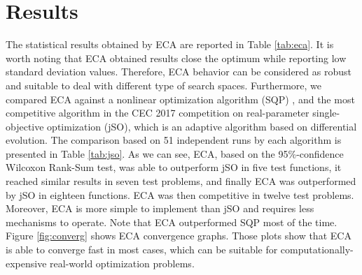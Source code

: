 \documentclass{svproc}
\begin{document}
\section{Results} %
\label{sec:results}

The statistical results obtained by ECA are reported in Table \ref{tab:eca}. 
It is worth noting  that ECA obtained results close the optimum 
while reporting low standard deviation values. Therefore, ECA behavior can 
be considered as robust and suitable to deal with different type of search spaces. 
Furthermore, we compared ECA against a nonlinear optimization algorithm (SQP) \cite{sqp}, 
and the most competitive algorithm in 
the CEC 2017 competition on real-parameter single-objective optimization (jSO), 
which is an adaptive algorithm based on differential evolution. The comparison 
based on 51 independent runs by each algorithm is presented in Table \ref{tab:jso}. 
As we can see, ECA, based on the 95\%-confidence Wilcoxon Rank-Sum test, 
was able to outperform jSO in five test functions, it reached similar 
results in seven test problems, and finally ECA was outperformed by jSO 
in eighteen functions. ECA was then competitive in twelve test problems. 
Moreover, ECA is more simple to implement than jSO and requires less 
mechanisms to operate. Note that  ECA outperformed SQP most of the time.
\\

Figure \ref{fig:converg} shows ECA convergence graphs. Those plots show that 
ECA is able to converge fast in most cases, which can be suitable for 
computationally-expensive real-world optimization problems.  
\end{document}
